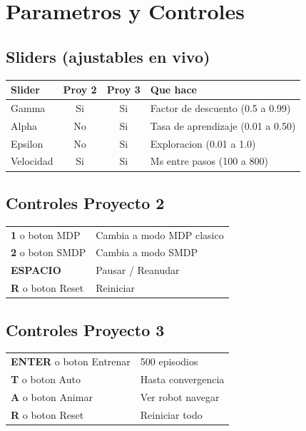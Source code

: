 \documentclass[11pt,a4paper]{article}
\begin{document}
\section{Parametros y Controles}

\subsection{Sliders (ajustables en vivo)}

\begin{center}
\begin{tabular}{l c c l}
\toprule
\rowcolor{tabheader}
Slider & Proy 2 & Proy 3 & Que hace \\
\midrule
Gamma & Si & Si & Factor de descuento (0.5 a 0.99) \\
Alpha & No & Si & Tasa de aprendizaje (0.01 a 0.50) \\
Epsilon & No & Si & Exploracion (0.01 a 1.0) \\
Velocidad & Si & Si & Ms entre pasos (100 a 800) \\
\bottomrule
\end{tabular}
\end{center}

\subsection{Controles Proyecto 2}

\begin{tabular}{ll}
\textbf{1} o boton MDP & Cambia a modo MDP clasico \\
\textbf{2} o boton SMDP & Cambia a modo SMDP \\
\textbf{ESPACIO} & Pausar / Reanudar \\
\textbf{R} o boton Reset & Reiniciar \\
\end{tabular}

\subsection{Controles Proyecto 3}

\begin{tabular}{ll}
\textbf{ENTER} o boton Entrenar & 500 episodios \\
\textbf{T} o boton Auto & Hasta convergencia \\
\textbf{A} o boton Animar & Ver robot navegar \\
\textbf{R} o boton Reset & Reiniciar todo \\
\end{tabular}
\end{document}
